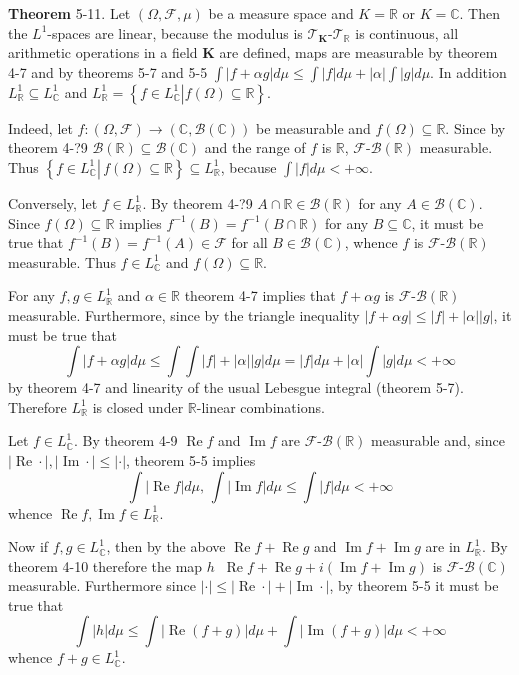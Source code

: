 \documentclass[a4paper]{article}
\newcommand{\obj}[1]{\left\{ #1 \right \}}
\newcommand{\brac}[1]{\left ( #1 \right )}
\newcommand{\induc}[1]{\left . #1 \right \vert}
\newcommand{\abs}[1]{\left | #1 \right |}
\newcommand{\Real}{\mathbb{R}}
\newcommand{\Cplx}{\mathbb{C}}
\newcommand{\Tcal}{\mathcal{T}}
\newcommand{\Fcal}{\mathcal{F}}
\newcommand{\borel}[1]{\mathcal{B}\brac{#1}}
\newcommand{\defn}{\mathop{\overset{\Delta}{=}}\nolimits}
\newcommand{\re}{\operatorname{Re}\nolimits}
\newcommand{\im}{\operatorname{Im}\nolimits}
\begin{document}
\label{thm:l_1_space_linear} \noindent \textbf{Theorem} 5-11.
Let $\brac{\Omega, \Fcal, \mu}$ be a measure space and $K=\Real$ or $K=\Cplx$. Then the $L^1$-spaces are linear, because the modulus is $\Tcal_\mathbf{K}$-$\Tcal_\Real$ is continuous, all arithmetic operations in a field $\mathbf{K}$ are defined, maps are measurable by theorem 4-7 and by theorems 5-7 and 5-5 $\int \abs{f+\alpha g} d\mu\leq \int \abs{f} d\mu + \abs{\alpha} \int \abs{g} d\mu$. In addition $L^1_\Real \subseteq L^1_\Cplx$ and $L^1_\Real = \obj{ \induc{ f\in L^1_\Cplx } f\brac{\Omega}\subseteq \Real }$.

Indeed, let $f:\brac{\Omega,\Fcal}\to\brac{\Cplx, \borel{\Cplx}}$ be measurable and $f\brac{\Omega}\subseteq \Real$. Since by theorem 4-?9 $\borel{\Real}\subseteq \borel{\Cplx}$ and the range of $f$ is $\Real$, $\Fcal$-$\borel{\Real}$ measurable. Thus $\obj{\induc{f\in L^1_\Cplx}\,f\brac{\Omega}\subseteq \Real}\subseteq L^1_\Real$, because $\int \abs{f} d\mu<+\infty$.

Conversely, let $f\in L^1_\Real$. By theorem 4-?9 $A\cap \Real\in \borel{\Real}$ for any $A\in\borel{\Cplx}$. Since $f\brac{\Omega}\subseteq \Real$ implies $f^{-1}\brac{B} = f^{-1}\brac{B\cap \Real}$ for any $B\subseteq \Cplx$, it must be true that $f^{-1}\brac{B} = f^{-1}\brac{A}\in \Fcal$ for all $B\in \borel{\Cplx}$, whence $f$ is $\Fcal$-$\borel{\Real}$ measurable. Thus $f\in L^1_\Cplx$ and $f\brac{\Omega}\subseteq \Real$.

For any $f,g\in L^1_\Real$ and $\alpha\in \Real$ theorem 4-7 implies that $f+\alpha g$ is $\Fcal$-$\borel{\Real}$ measurable. Furthermore, since by the triangle inequality $\abs{f+\alpha g}\leq \abs{f}+\abs{\alpha}\abs{g}$, it must be true that \[\int \abs{f+\alpha g} d\mu\leq \int \int \abs{f}+\abs{\alpha} \abs{g} d\mu = \abs{f} d\mu + \abs{\alpha}\int \abs{g} d\mu<+\infty\] by theorem 4-7 and linearity of the usual Lebesgue integral (theorem 5-7). Therefore $L^1_\Real$ is closed under $\Real$-linear combinations.

Let $f\in L^1_\Cplx$. By theorem 4-9 $\re f$ and $\im f$ are $\Fcal$-$\borel{\Real}$ measurable and, since $\abs{\re \cdot}, \abs{\im \cdot }\leq \abs{\cdot}$, theorem 5-5 implies \[\int \abs{\re f}d\mu,\,\int \abs{\im f}d\mu \leq \int \abs{f}d\mu < +\infty\] whence $\re f, \im f\in L^1_\Real$.

Now if $f,g\in L^1_\Cplx$, then by the above $\re f + \re g$ and $\im f + \im g$ are in $L^1_\Real$. By theorem 4-10 therefore the map $h\defn \re f + \re g + i\brac{\im f + \im g}$ is $\Fcal$-$\borel{\Cplx}$ measurable. Furthermore since $\abs{\cdot}\leq \abs{\re \cdot}+\abs{\im \cdot}$, by theorem 5-5 it must be true that \[\int \abs{h}d\mu \leq \int \abs{\re \brac{f+g}}d\mu+\int \abs{\im \brac{f+g}}d\mu < +\infty\] whence $f+g\in L^1_\Cplx$.
\end{document}
